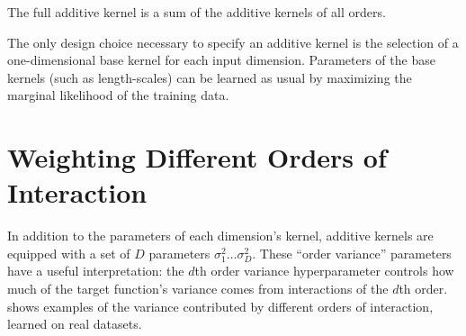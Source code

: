 The full additive kernel is a sum of the additive kernels of all orders.



The only design choice necessary to specify an additive kernel is the selection of a one-dimensional base kernel for each input dimension.
Parameters of the base kernels (such as length-scales) can be learned as usual by maximizing the marginal likelihood of the training data.

\section{Weighting Different Orders of Interaction}
In addition to the parameters of each dimension's kernel, additive kernels are equipped with a set of $D$ parameters $\sigma_1^2 \dots \sigma_D^2$.
These ``order variance'' parameters have a useful interpretation:  the $d$th order variance hyperparameter controls how much of the target function's variance comes from interactions of the $d$th order.
%
%
%
%
 shows examples of the variance contributed by different orders of interaction, learned on real datasets.

